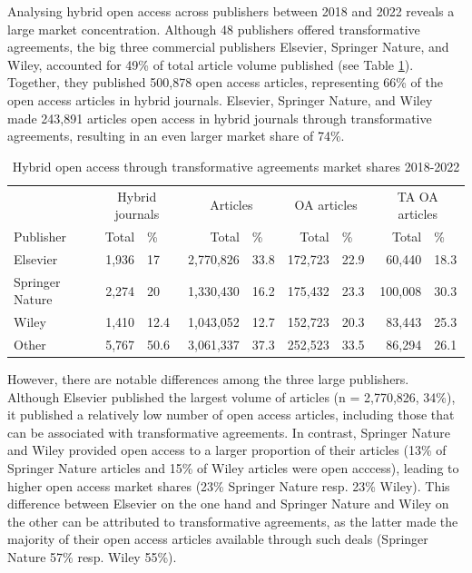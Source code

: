 \documentclass[a4paper,man,floatsintext,longtable,noextraspace,12pt]{apa6}
\begin{document}
Analysing hybrid open access across publishers between 2018 and 2022
reveals a large market concentration. Although 48 publishers offered
transformative agreements, the big three commercial publishers Elsevier,
Springer Nature, and Wiley, accounted for 49\% of total article volume
published (see Table \ref{tab:publisher_league_table}). Together, they
published 500,878 open access articles, representing 66\% of the open
access articles in hybrid journals. Elsevier, Springer Nature, and Wiley
made 243,891 articles open access in hybrid journals through
transformative agreements, resulting in an even larger market share of
74\%.

\begin{table}[H]

\caption{\label{tab:publisher_league_table}Hybrid open access through transformative agreements market shares 2018-2022}
\centering
\begin{tabular}[t]{lrlrlrlrl}
\toprule
\multicolumn{1}{c}{ } & \multicolumn{2}{c}{Hybrid journals} & \multicolumn{2}{c}{Articles} & \multicolumn{2}{c}{OA articles} & \multicolumn{2}{c}{TA OA articles} \\
\cmidrule(l{3pt}r{3pt}){2-3} \cmidrule(l{3pt}r{3pt}){4-5} \cmidrule(l{3pt}r{3pt}){6-7} \cmidrule(l{3pt}r{3pt}){8-9}
Publisher & Total & \% & Total & \% & Total & \% & Total & \%\\
\midrule
Elsevier & 1,936 & 17 & 2,770,826 & 33.8 & 172,723 & 22.9 & 60,440 & 18.3\\
Springer Nature & 2,274 & 20 & 1,330,430 & 16.2 & 175,432 & 23.3 & 100,008 & 30.3\\
Wiley & 1,410 & 12.4 & 1,043,052 & 12.7 & 152,723 & 20.3 & 83,443 & 25.3\\
Other & 5,767 & 50.6 & 3,061,337 & 37.3 & 252,523 & 33.5 & 86,294 & 26.1\\
\bottomrule
\end{tabular}
\end{table}

However, there are notable differences among the three large publishers.
Although Elsevier published the largest volume of articles (n =
2,770,826, 34\%), it published a relatively low number of open access
articles, including those that can be associated with transformative
agreements. In contrast, Springer Nature and Wiley provided open access
to a larger proportion of their articles (13\% of Springer Nature
articles and 15\% of Wiley articles were open acccess), leading to
higher open access market shares (23\% Springer Nature resp. 23\%
Wiley). This difference between Elsevier on the one hand and Springer
Nature and Wiley on the other can be attributed to transformative
agreements, as the latter made the majority of their open access
articles available through such deals (Springer Nature 57\% resp. Wiley
55\%).
\end{document}
